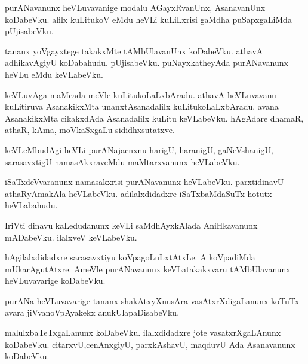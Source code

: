 \documentclass{article}
\begin{document}
\begin{mn}
purANavanunx  heVLuvavanige  modalu  AGayxRvanUnx,  AsanavanUnx  koDabeVku.  alilx  kuLitukoV  eMdu  
heVLi  kuLiLxrisi  gaMdha puSapxgaLiMda  pUjisabeVku.
\end{mn}

\begin{mn}
tananx  yoVgayxtege  takakxMte  tAMbUlavanUnx  koDabeVku.  athavA  adhikavAgiyU  koDabahudu.  pUjisabeVku.  
puNayxkatheyAda  purANavanunx  heVLu  eMdu  keVLabeVku.
\end{mn}

\begin{mn}
keVLuvAga  maMcada  meVle  kuLitukoLaLxbAradu.  athavA  heVLuvavanu  kuLitiruva  AsanakikxMta  
unanxtAsanadalilx  kuLitukoLaLxbAradu.  avana  AsanakikxMta  cikakxdAda  Asanadalilx  kuLitu  
keVLabeVku.  hAgAdare  dhamaR,  athaR,  kAma,  moVkaSxgaLu  sididhxsutatxve.
\end{mn}

\begin{mn}
keVLeMbudAgi  heVLi  purANajacnxnu  harigU,  haranigU,  gaNeVshanigU,  sarasavxtigU  namasAkxraveMdu  
maMtarxvanunx  heVLabeVku.
\end{mn}

\begin{mn}
iSaTxdeVvaranunx  namasakxrisi  purANavanunx  heVLabeVku.  parxtidinavU  athaRyAmakAla  heVLabeVku.  
adilalxdidadxre  iSaTxbaMdaSuTx  hotutx  heVLabahudu.
\end{mn}

\begin{mn}
IriVti  dinavu  kaLedudanunx  keVLi  saMdhAyxkAlada  AniHkavanunx  mADabeVku.  ilalxveV  keVLabeVku.
\end{mn}

\begin{mn}
hAgilalxdidadxre  sarasavxtiyu  koVpagoLuLxtAtxLe.  A  koVpadiMda  mUkarAgutAtxre.  AmeVle  
purANavanunx  keVLatakakxvaru  tAMbUlavanunx  heVLuvavarige  koDabeVku.  
\end{mn}

\begin{mn}
purANa  heVLuvavarige  tananx  shakAtxyXnusAra  vasAtxrXdigaLanunx  koTuTx  avara  jiVvanoVpAyakekx  anukUlapaDisabeVku.
\end{mn}

\begin{mn}
malulxbaTeTxgaLanunx  koDabeVku.  ilalxdidadxre  jote  vasatxrXgaLAnunx  koDabeVku.  citarxvU,cenAnxgiyU,  
parxkAshavU,  maqduvU  Ada  Asanavanunx  koDabeVku.
\end{mn}
\end{document}
